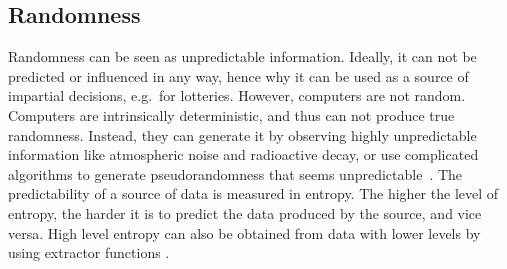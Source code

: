 \subsection{Randomness}
Randomness can be seen as unpredictable information. Ideally, it can not be predicted or influenced in any way, hence why it can be used as a source of impartial decisions, e.g.\ for lotteries.
However, computers are not random. Computers are intrinsically deterministic, and thus can not produce true randomness. Instead, they can generate it by observing highly unpredictable information like atmospheric noise and radioactive decay, or use complicated algorithms to generate pseudorandomness that seems unpredictable~\cite{randomsources}.
The predictability of a source of data is measured in entropy. The higher the level of entropy, the harder it is to predict the data produced by the source, and vice versa. High level entropy can also be obtained from data with lower levels by using extractor functions \cite{pseudorandomness}. 
